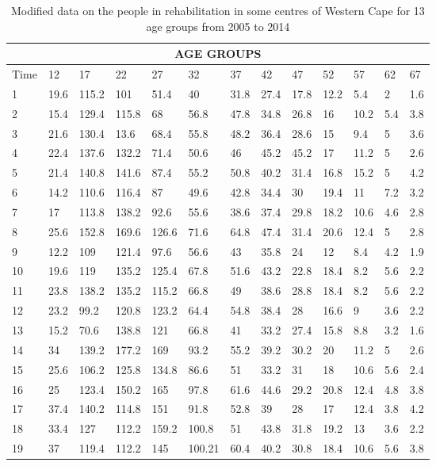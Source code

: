 \begin{table}[h!]\label{data2}
\noindent\begin{tabular}{|l|l|l|l|l|l|l|l|l|l|l|l|l|}
\hline
\multicolumn{13}{|c|}{AGE GROUPS} \\
\hline
 Time&12&17&22&27&32&37&42&47&52&57&62&67 \\ \hline
1&  19.6 &115.2& 101&51.4  &40&31.8& 27.4& 17.8 &12.2&5.4& 2&1.6   \\ \hline
2&   15.4&129.4&115.8 & 68 &56.8&47.8&34.8 & 26.8 &16&10.2&5.4&3.8 \\ \hline
3&  21.6&130.4& 13.6& 68.4  &55.8&48.2&36.4&28.6 &15&9.4&5&3.6   \\ \hline
4& 22.4&137.6  &132.2&71.4&50.6 &46  &45.2&45.2&17 &11.2 &5 &2.6\\ \hline
5&21.4&140.8&141.6  &87.4&55.2&50.8 &40.2  &31.4&16.8&15.2&5   &4.2 \\ \hline
6& 14.2 &110.6&116.4&87  &49.6&42.8&34.4& 30  &19.4&11&7.2 & 3.2 \\ \hline  
7& 17 & 113.8  &138.2&92.6&55.6 &38.6   &37.4&29.8&18.2 &10.6 &4.6&2.8 \\ \hline
8& 25.6&152.8&169.6&126.6   &71.6&64.8&47.4 & 31.4  &20.6&12.4&5 &2.8 \\ \hline
9& 12.2&109&121.4&97.6  &56.6&43&35.8 &24  &12&8.4 &4.2&1.9 \\ \hline
10& 19.6&119&135.2&125.4   &67.8&51.6&43.2 &22.8  &18.4&8.2&5.6 &2.2   \\ \hline
11& 23.8&138.2&135.2 &115.2   &66.8&49&38.6 &28.8  &18.4&8.2&5.6 &2.2\\ \hline
 12&23.2&99.2&120.8 &123.2   &64.4&54.8&38.4& 28 &16.6&9& 3.6&2.2\\ \hline
13& 15.2&70.6&138.8 &121  &66.8&41&33.2 & 27.4 &15.8&8.8& 3.2&1.6   \\ \hline
14&  34 &139.2&177.2 &169   &93.2&55.2 & 39.2&30.2 &20&11.2&5 &2.6   \\ \hline  
15& 25.6 &106.2&125.8 & 134.8  &86.6&51&33.2 &31   &18&10.6&5.6 &2.4 \\ \hline 
16&  25&123.4&150.2 &165   &97.8&61.6&44.6 &29.2  &20.8&12.4&4.8&3.8   \\ \hline
17&37.4&140.2&114.8 &151   &91.8&52.8&39 &28   &17&12.4&3.8 &4.2 \\ \hline
18& 33.4&127&112.2 &159.2   &100.8&51&43.8 &31.8   &19.2&13&3.6 &2.2 \\ \hline
19& 37&119.4&112.2 &145   &100.21&60.4&40.2 &30.8   &18.4&10.6&5.6 &3.8 \\ \hline
\end{tabular}
\caption{Modified data on the people in rehabilitation in some centres of Western Cape for 13 age groups from 2005 to 2014}
\end{table} 